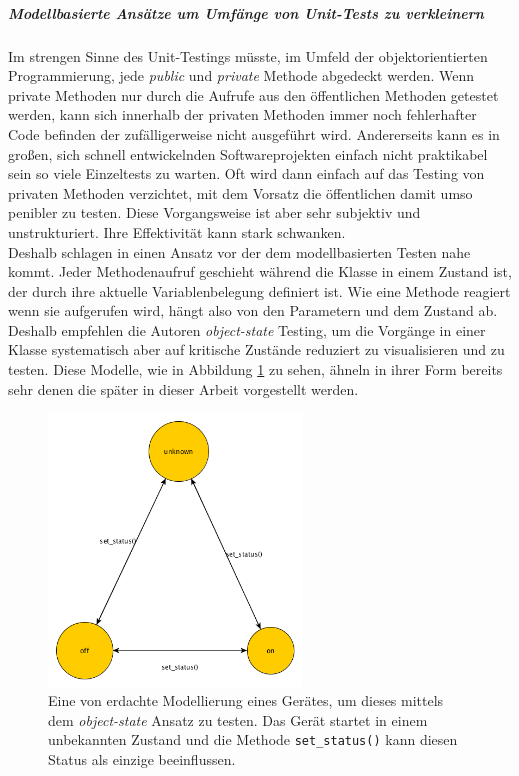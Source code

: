 \subparagraph{Modellbasierte Ansätze um Umfänge von Unit-Tests zu verkleinern}
Im strengen Sinne des Unit-Testings müsste, im Umfeld der objektorientierten Programmierung, jede \textit{public} und \textit{private} Methode abgedeckt werden. Wenn private Methoden nur durch die Aufrufe aus den öffentlichen Methoden getestet werden, kann sich innerhalb der privaten Methoden immer noch fehlerhafter Code befinden der zufälligerweise nicht ausgeführt wird. Andererseits kann es in großen, sich schnell entwickelnden Softwareprojekten einfach nicht praktikabel sein so viele Einzeltests zu warten. Oft wird dann einfach auf das Testing von privaten Methoden verzichtet, mit dem Vorsatz die öffentlichen damit umso penibler zu testen. Diese Vorgangsweise ist aber sehr subjektiv und unstrukturiert. Ihre Effektivität kann stark schwanken.\\
Deshalb schlagen \citeauthor{linz_testing_2014} in \cite{linz_testing_2014} einen Ansatz vor der dem modellbasierten Testen nahe kommt. Jeder Methodenaufruf geschieht während die Klasse in einem Zustand ist, der durch ihre aktuelle Variablenbelegung definiert ist. Wie eine Methode reagiert wenn sie aufgerufen wird, hängt also von den Parametern und dem Zustand ab. Deshalb empfehlen die Autoren \textit{object-state} Testing, um die Vorgänge in einer Klasse systematisch aber auf kritische Zustände reduziert zu visualisieren und zu testen. Diese Modelle, wie in Abbildung \ref{fig:mbt_unit} zu sehen, ähneln in ihrer Form bereits sehr denen die später in dieser Arbeit vorgestellt werden.

\begin{figure}[h] 
  \centering
     \includegraphics[width=0.6\textwidth]{figures/mbt_unit.png}
  \caption{Eine von \citeauthor{linz_testing_2014} erdachte Modellierung eines Gerätes, um dieses mittels dem \textit{object-state} Ansatz zu testen. Das Gerät startet in einem unbekannten Zustand und die Methode \texttt{set\_status()} kann diesen Status als einzige beeinflussen.}
  \label{fig:mbt_unit}
\end{figure}

